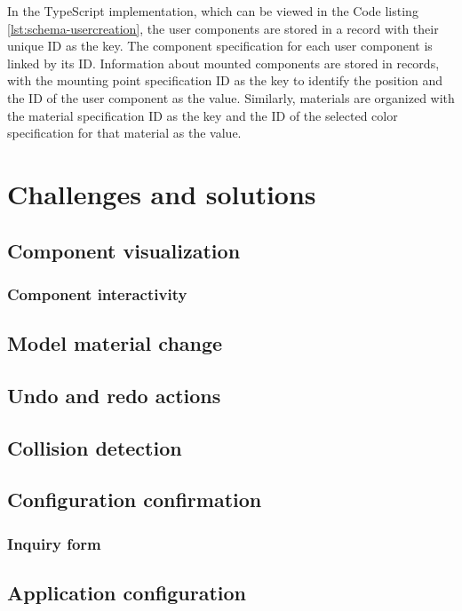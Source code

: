 In the TypeScript implementation, which can be viewed in the Code listing \ref{lst:schema-usercreation}, the user components are stored in a record with their unique ID as the key. The component specification for each user component is linked by its ID. Information about mounted components are stored in records, with the mounting point specification ID as the key to identify the position and the ID of the user component as the value. Similarly, materials are organized with the material specification ID as the key and the ID of the selected color specification for that material as the value.


\section{Challenges and solutions}

\subsection{Component visualization}
\subsubsection{Component interactivity}

\subsection{Model material change}

\subsection{Undo and redo actions}

\subsection{Collision detection}

\subsection{Configuration confirmation}
\subsubsection{Inquiry form}

\subsection{Application configuration}
